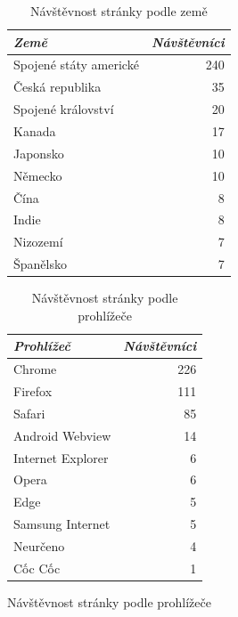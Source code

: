 \documentclass[a4paper, 12pt, twoside]{article}
\newcommand{\ra}[1]{\renewcommand{\arraystretch}{#1}} %
\begin{document}
  \begin{figure}[H]
    \begin{minipage}[b]{0.475\textwidth}
      \begin{table}[H]
        \caption{Návštěvnost stránky podle země}
        \label{tab:Návštěvnost stránky podle země}
        \footnotesize
        \centering
        \ra{1.3}
        \begin{tabular}{lr}
          \toprule
          \emph{Země} & \emph{Návštěvníci} \\
          \midrule
          Spojené státy americké & \num{240} \\
          Česká republika	       & \num{35} \\
          Spojené království     & \num{20} \\
          Kanada                 & \num{17} \\
          Japonsko               & \num{10} \\
          Německo                & \num{10} \\
          Čína                   & \num{8} \\
          Indie                  & \num{8} \\
          Nizozemí               & \num{7} \\
          Španělsko              & \num{7} \\
          \bottomrule
        \end{tabular}
      \end{table}
    \end{minipage}\hfill
    \begin{minipage}[b]{0.475\textwidth}
      \begin{table}[H]
        \caption{Návštěvnost stránky podle prohlížeče}
        \label{tab:Návštěvnost stránky podle prohlížeče}
        \footnotesize
        \centering
        \ra{1.3}
        \begin{tabular}{lr}
          \toprule
          \emph{Prohlížeč} & \emph{Návštěvníci} \\
          \midrule
          Chrome            & \num{226} \\
          Firefox	          & \num{111} \\
          Safari            & \num{85} \\
          Android Webview   & \num{14} \\
          Internet Explorer & \num{6} \\
          Opera             & \num{6} \\
          Edge              & \num{5} \\
          Samsung Internet  & \num{5} \\
          Neurčeno          & \num{4} \\
          Cốc Cốc           & \num{1} \\
          \bottomrule
        \end{tabular}
      \end{table}
    \end{minipage}
  \end{figure}
\end{document}
